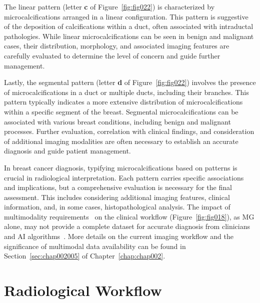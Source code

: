 The linear pattern (letter {\bf c} of Figure~\ref{fig:fig022}) is characterized by microcalcifications arranged in a linear configuration.
This pattern is suggestive of the deposition of calcifications within a duct, often associated with intraductal pathologies.
While linear microcalcifications can be seen in benign and malignant cases, their distribution, morphology, and associated imaging features are carefully evaluated to determine the level of concern and guide further management.

Lastly, the segmental pattern (letter {\bf d} of Figure~\ref{fig:fig022}) involves the presence of microcalcifications in a duct or multiple ducts, including their branches.
This pattern typically indicates a more extensive distribution of microcalcifications within a specific segment of the breast.
Segmental microcalcifications can be associated with various breast conditions, including benign and malignant processes.
Further evaluation, correlation with clinical findings, and consideration of additional imaging modalities are often necessary to establish an accurate diagnosis and guide patient management.

In breast cancer diagnosis, typifying microcalcifications based on patterns is crucial in radiological interpretation.
Each pattern carries specific associations and implications, but a comprehensive evaluation is necessary for the final assessment.
This includes considering additional imaging features, clinical information, and, in some cases, histopathological analysis.
The impact of multimodality requirements~\cite{https://doi.org/10.1002/cncr.32910} on the clinical workflow (Figure~\ref{fig:fig018}), as \ac{MG} alone, may not provide a complete dataset for accurate diagnosis from clinicians and \ac{AI} algorithms~\cite{DANA2020541}.
More details on the current imaging workflow and the significance of multimodal data availability can be found in Section~\ref{sec:chap002005} of Chapter~\ref{chap:chap002}.

\section{Radiological Workflow}
\label{sec:app001005}


